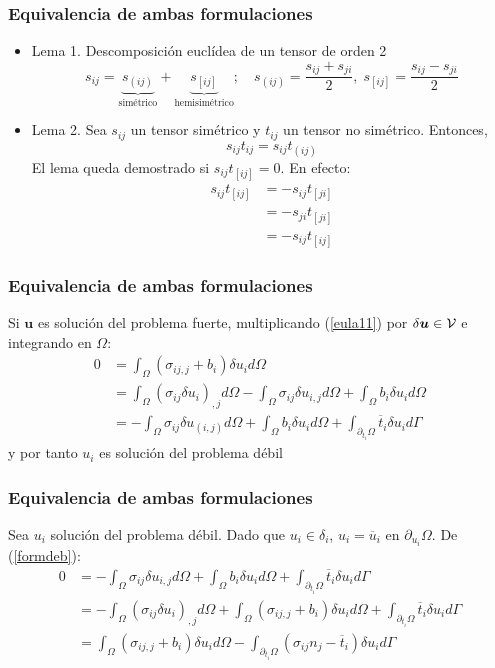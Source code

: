 \documentclass[10pt, aspectratio=43]{beamer}
\begin{document}
\begin{frame}
\frametitle{Equivalencia de ambas formulaciones}
\begin{itemize}
\item Lema 1. Descomposición euclídea de un tensor de orden 2
\begin{equation*}
s_{ij}=\underbrace{s_{(ij)}}_{\textrm{simétrico}}+
       \underbrace{s_{[ij]}}_{\textrm{hemisimétrico}};
\quad
s_{(ij)}=\frac{s_{ij}+s_{ji}}{2},
\;
s_{[ij]}=\frac{s_{ij}-s_{ji}}{2}
\end{equation*}
\item Lema 2. Sea $s_{ij}$ un tensor simétrico y $t_{ij}$ un tensor no 
simétrico. Entonces,
$$
s_{ij} t_{ij}=s_{ij} t_{(ij)}
$$
El lema queda demostrado si $s_{ij} t_{[ij]}=0$. En efecto:
\begin{align*}
s_{ij} t_{[ij]}&=-s_{ij} t_{[ji]} \\
\mbox{}        &=-s_{ji} t_{[ji]} \\
\mbox{}        &=-s_{ij} t_{[ij]}
\end{align*}
\end{itemize}
\end{frame}
\begin{frame}
\frametitle{Equivalencia de ambas formulaciones}
Si $\bm{u}$ es solución del problema fuerte, 
multiplicando (\ref{eula11}) por $\delta \bm{u} \in {\cal V}$ e integrando en
$\Omega$:
\begin{align}
0&= \int_{\Omega} (\sigma_{ij,j}+b_i)\delta u_i d\Omega \nonumber \\
 &= \int_{\Omega} (\sigma_{ij}\delta u_i)_{,j} d \Omega -
    \int_{\Omega}  \sigma_{ij}\delta u_{i,j} d \Omega +  
    \int_{\Omega} b_i \delta u_i d\Omega \nonumber \\
 &=-\int_{\Omega} \sigma_{ij}\delta u_{(i,j)} d \Omega +
    \int_{\Omega}  b_i \delta u_i d\Omega + 
    \int_{\partial_{t_i}\Omega}  \overline{t}_i \delta u_i d \Gamma
\end{align}
y por tanto $u_i$ es solución del problema débil
\end{frame}
\begin{frame}
\frametitle{Equivalencia de ambas formulaciones}
Sea $u_i$ solución del problema débil. Dado que $u_i \in \delta_i$, $u_i=
\overline{u}_i$ en $\partial_{u_i} \Omega$. De (\ref{formdeb}):
\begin{align}
0&=-\int_{\Omega} \sigma_{ij}\delta u_{i,j} d \Omega +
  \int_{\Omega}  b_i \delta u_i d\Omega +
  \int_{\partial_{t_i}\Omega}  \overline{t}_i \delta u_i d \Gamma \nonumber \\
 &=-\int_{\Omega} (\sigma_{ij}\delta u_i)_{,j} d \Omega +
  \int_{\Omega} (\sigma_{ij,j}+b_i)\delta u_i d \Omega +
  \int_{\partial_{t_i}\Omega}  \overline{t}_i \delta u_i d \Gamma \nonumber \\
 &= \int_{\Omega} (\sigma_{ij,j}+b_i)\delta u_i d \Omega -
  \int_{\partial_{t_i}\Omega}(\sigma_{ij}n_j-\overline{t}_i)\delta u_i d \Gamma
\label{demoeq}
\end{align}
\end{frame}
\end{document}
